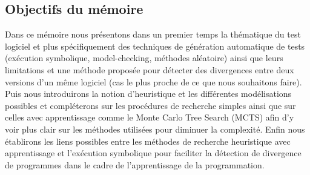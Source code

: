 %
%

\subsection*{Objectifs du mémoire}
Dans ce mémoire nous présentons dans un premier temps la thématique du test logiciel et plus spécifiquement des techniques de génération automatique de tests (exécution symbolique, model-checking, méthodes aléatoire) ainsi que leurs limitations et une méthode proposée pour détecter des divergences entre deux versions d'un même logiciel (cas le plus proche de ce que nous souhaitons faire).
Puis nous introduirons la notion d'heuristique et les différentes modélisations possibles et compléterons sur les procédures de recherche simples ainsi que sur celles avec apprentissage comme le Monte Carlo Tree Search (MCTS) afin d'y voir plus clair sur les méthodes utilisées pour diminuer la complexité.
Enfin nous établirons les liens possibles entre les méthodes de recherche heuristique avec apprentissage et l'exécution symbolique pour faciliter la détection de divergence de programmes dans le cadre de l'apprentissage de la programmation.

